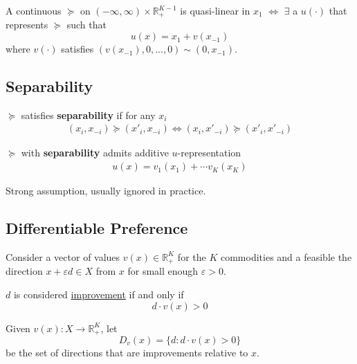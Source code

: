 \documentclass[11pt]{elegantbook}
\begin{document}
\begin{theorem}[Quasi-Linearity $\Leftrightarrow$ $u(x)=x_1+v(x_{-1})$]
    A continuous $\succeq$ on $(-\infty,\infty)\times \mathbb{R}_+^{K-1}$ is quasi-linear in $x_1$ $\Leftrightarrow$ $\exists$ a $u(\cdot)$ that represents $\succeq$ such that $$u(x)=x_1+v(x_{-1})$$
    where $v(\cdot)$ satisfies $(v(x_{-1}),0,...,0)\sim(0,x_{-1})$.
\end{theorem}

\subsection{Separability}
\begin{definition}[Separability]
    \normalfont
    $\succeq$ satisfies \textbf{separability} if for any $x_i$
    \begin{equation}
        \begin{aligned}
            (x_i, x_{-i})\succeq (x'_i, x_{-i}) \Leftrightarrow (x_i, x'_{-i})\succeq (x'_i, x'_{-i})
        \end{aligned}
        \nonumber
    \end{equation}
\end{definition}

\begin{theorem}
    $\succeq$ with \textbf{separability} admits additive $u$-representation
    \begin{equation}
        \begin{aligned}
            u(x)=v_1(x_1)+\cdots v_K(x_K)
        \end{aligned}
        \nonumber
    \end{equation}
\end{theorem}

\begin{note}
    Strong assumption, usually ignored in practice.
\end{note}


\subsection{Differentiable Preference}
Consider a vector of values $v(x)\in \mathbb{R}^K_+$ for the $K$ commodities and a feasible the direction $x+\varepsilon d\in X$ from $x$ for small enough $\varepsilon>0$.

$d$ is considered \underline{improvement} if and only if $$d\cdot v(x)>0$$

Given $v(x): X \rightarrow \mathbb{R}^K_+$, let $$D_v(x)=\{d:d\cdot v(x)>0\}$$
be the set of directions that are improvements relative to $x$.
\end{document}
